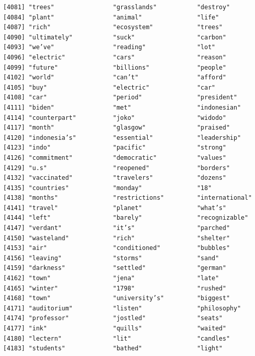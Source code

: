 \documentclass[
  letterpaper,
  DIV=11,
  numbers=noendperiod]{scrartcl}
\begin{document}
\begin{verbatim}
[4081] "trees"                "grasslands"           "destroy"             
[4084] "plant"                "animal"               "life"                
[4087] "rich"                 "ecosystem"            "trees"               
[4090] "ultimately"           "suck"                 "carbon"              
[4093] "we’ve"                "reading"              "lot"                 
[4096] "electric"             "cars"                 "reason"              
[4099] "future"               "billions"             "people"              
[4102] "world"                "can’t"                "afford"              
[4105] "buy"                  "electric"             "car"                 
[4108] "car"                  "period"               "president"           
[4111] "biden"                "met"                  "indonesian"          
[4114] "counterpart"          "joko"                 "widodo"              
[4117] "month"                "glasgow"              "praised"             
[4120] "indonesia’s"          "essential"            "leadership"          
[4123] "indo"                 "pacific"              "strong"              
[4126] "commitment"           "democratic"           "values"              
[4129] "u.s"                  "reopened"             "borders"             
[4132] "vaccinated"           "travelers"            "dozens"              
[4135] "countries"            "monday"               "18"                  
[4138] "months"               "restrictions"         "international"       
[4141] "travel"               "planet"               "what’s"              
[4144] "left"                 "barely"               "recognizable"        
[4147] "verdant"              "it’s"                 "parched"             
[4150] "wasteland"            "rich"                 "shelter"             
[4153] "air"                  "conditioned"          "bubbles"             
[4156] "leaving"              "storms"               "sand"                
[4159] "darkness"             "settled"              "german"              
[4162] "town"                 "jena"                 "late"                
[4165] "winter"               "1798"                 "rushed"              
[4168] "town"                 "university’s"         "biggest"             
[4171] "auditorium"           "listen"               "philosophy"          
[4174] "professor"            "jostled"              "seats"               
[4177] "ink"                  "quills"               "waited"              
[4180] "lectern"              "lit"                  "candles"             
[4183] "students"             "bathed"               "light"               

\end{verbatim}
\end{document}
